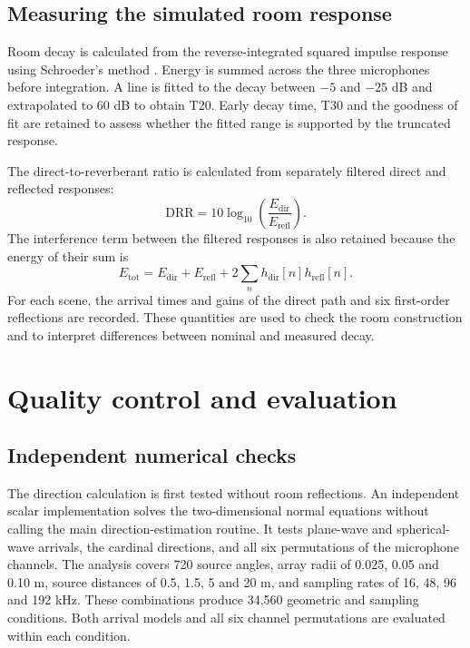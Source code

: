 \documentclass{edpsci}
\begin{document}
\subsection{Measuring the simulated room response}

Room decay is calculated from the reverse-integrated squared impulse response using Schroeder's method \citep{schroeder}. Energy is summed across the three microphones before integration. A line is fitted to the decay between $-5$ and $-25$ dB and extrapolated to 60 dB to obtain T20. Early decay time, T30 and the goodness of fit are retained to assess whether the fitted range is supported by the truncated response.

The direct-to-reverberant ratio is calculated from separately filtered direct and reflected responses:
\begin{equation}
	\mathrm{DRR}
	=
	10\log_{10}
	\left(
	\frac{E_{\mathrm{dir}}}{E_{\mathrm{refl}}}
	\right).
\end{equation}
The interference term between the filtered responses is also retained because the energy of their sum is
\begin{equation}
	E_{\mathrm{tot}}
	=
	E_{\mathrm{dir}}
	+
	E_{\mathrm{refl}}
	+
	2\sum_n h_{\mathrm{dir}}[n]h_{\mathrm{refl}}[n].
\end{equation}
For each scene, the arrival times and gains of the direct path and six first-order reflections are recorded. These quantities are used to check the room construction and to interpret differences between nominal and measured decay.

\section{Quality control and evaluation}

\subsection{Independent numerical checks}

The direction calculation is first tested without room reflections. An independent scalar implementation solves the two-dimensional normal equations without calling the main direction-estimation routine. It tests plane-wave and spherical-wave arrivals, the cardinal directions, and all six permutations of the microphone channels. The analysis covers 720 source angles, array radii of 0.025, 0.05 and 0.10 m, source distances of 0.5, 1.5, 5 and 20 m, and sampling rates of 16, 48, 96 and 192 kHz. These combinations produce 34,560 geometric and sampling conditions. Both arrival models and all six channel permutations are evaluated within each condition.
\end{document}
